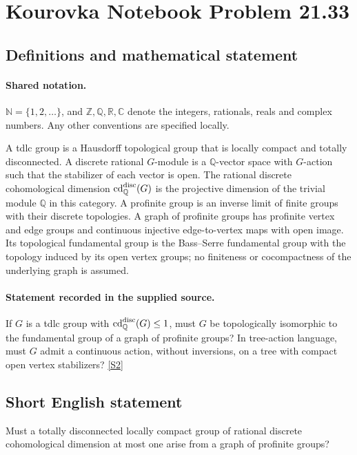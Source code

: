 \documentclass[11pt]{article}
\newcommand{\sref}[2]{\hyperlink{source:#1:#2}{[S#2]}}
\begin{document}
\section{Kourovka Notebook Problem 21.33}\label{statement}

\subsection{Definitions and mathematical statement}

\paragraph{Shared notation.}$\mathbb N=\{1,2,\ldots\}$, and $\mathbb Z,\mathbb Q,\mathbb R,\mathbb C$ denote the integers, rationals, reals and complex numbers. Any other conventions are specified locally.


A tdlc group is a Hausdorff topological group that is locally compact and totally disconnected. A discrete rational $G$-module is a $\mathbb Q$-vector space with $G$-action such that the stabilizer of each vector is open. The rational discrete cohomological dimension $\operatorname{cd}_{\mathbb Q}^{\rm disc}(G)$ is the projective dimension of the trivial module $\mathbb Q$ in this category. A profinite group is an inverse limit of finite groups with their discrete topologies. A graph of profinite groups has profinite vertex and edge groups and continuous injective edge-to-vertex maps with open image. Its topological fundamental group is the Bass--Serre fundamental group with the topology induced by its open vertex groups; no finiteness or cocompactness of the underlying graph is assumed.
\paragraph{Statement recorded in the supplied source.}
If $G$ is a tdlc group with $\operatorname{cd}_{\mathbb Q}^{\rm disc}(G)\leq1$, must $G$ be topologically isomorphic to the fundamental group of a graph of profinite groups? In tree-action language, must $G$ admit a continuous action, without inversions, on a tree with compact open vertex stabilizers? \sref{statement}{2}
\subsection{Short English statement}
Must a totally disconnected locally compact group of rational discrete cohomological dimension at most one arise from a graph of profinite groups?
\end{document}
